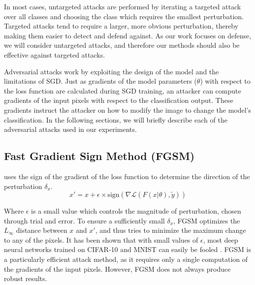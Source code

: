 In most cases, untargeted attacks are performed by iterating a targeted attack over all classes and choosing the class which requires the smallest perturbation.
Targeted attacks tend to require a larger, more obvious perturbation, thereby making them easier to detect and defend against.
As our work focuses on defense, we will consider untargeted attacks, and therefore our methods should also be effective against targeted attacks.

Adversarial attacks work by exploiting the design of the model and the limitations of SGD. 
Just as gradients of the model parameters ($\theta$) with respect to the loss function are calculated during SGD training, an attacker can compute gradients of the input pixels with respect to the classification output.
These gradients instruct the attacker on how to modify the image to change the model's classification.
In the following sections, we will briefly describe each of the adversarial attacks used in our experiments.

\subsection{Fast Gradient Sign Method (FGSM)} 
\cite{Goodfellow2014ExplainingAH} uses the sign of the gradient of the loss function to determine the direction of the perturbation $\delta_x$. 
\[
    x' = x + \epsilon \times \text{sign}(\nabla \mathcal{L} (F(x|\theta),\widetilde{y}))
\]

Where $\epsilon$ is a small value which controls the magnitude of perturbation, chosen through trial and error.
To ensure a sufficiently small $\delta_x$, FGSM optimizes the $L_\infty$ distance between $x$ and $x'$, and thus tries to minimize the maximum change to any of the pixels.
It has been shown that with small values of $\epsilon$, most deep neural networks trained on CIFAR-10 and MNIST can easily be fooled \cite{Goodfellow2014ExplainingAH}.
FGSM is a particularly efficient attack method, as it requires only a single computation of the gradients of the input pixels.
However, FGSM does not always produce robust results.%

